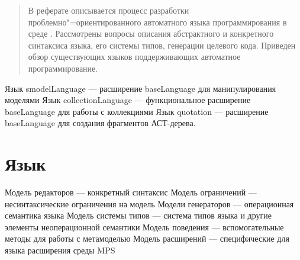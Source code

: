 \documentclass[a4paper,12pt]{article}
\begin{document}

\begin{abstract}
В реферате описывается процесс разработки проблемно"=ориентированного автоматного языка программирования в среде \MPS{}. Рассмотрены вопросы описания абстрактного и конкретного синтаксиса языка, его системы типов, генерации целевого кода. Приведен обзор существующих языков поддерживающих автоматное программирование.
\end{abstract}

\tableofcontents







\TBD Язык smodelLanguage — расширение baseLanguage для манипулирования моделями
\TBD Язык collectionLanguage — функциональное расширение baseLanguage для работы с коллекциями
\TBD Язык quotation — расширение baseLanguage для создания фрагментов АСТ-дерева.



\section{Язык }



\TBD Модель редакторов — конкретный синтаксис
\TBD Модель ограничений — несинтаксические ограничения на модель
\TBD Модели генераторов — операционная семантика языка
\TBD Модель системы типов — система типов языка и другие элементы неоперационной семантики
\TBD Модель поведения — вспомогательные методы для работы с метамоделью
\TBD Модель расширений — специфические для языка расширения среды MPS
\end{document}
